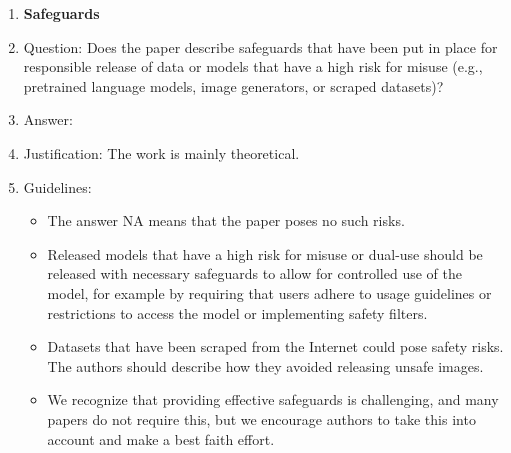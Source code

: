 \documentclass{article}
\theoremstyle{plain}
\theoremstyle{definition}
\theoremstyle{remark}
\begin{document}
\begin{enumerate}
\item {\bf Safeguards}
    \item[] Question: Does the paper describe safeguards that have been put in place for responsible release of data or models that have a high risk for misuse (e.g., pretrained language models, image generators, or scraped datasets)?
    \item[] Answer: \answerNA{} %
    \item[] Justification: The work is mainly theoretical.
    \item[] Guidelines:
    \begin{itemize}
        \item The answer NA means that the paper poses no such risks.
        \item Released models that have a high risk for misuse or dual-use should be released with necessary safeguards to allow for controlled use of the model, for example by requiring that users adhere to usage guidelines or restrictions to access the model or implementing safety filters. 
        \item Datasets that have been scraped from the Internet could pose safety risks. The authors should describe how they avoided releasing unsafe images.
        \item We recognize that providing effective safeguards is challenging, and many papers do not require this, but we encourage authors to take this into account and make a best faith effort.
    \end{itemize}


\end{enumerate}
\end{document}
